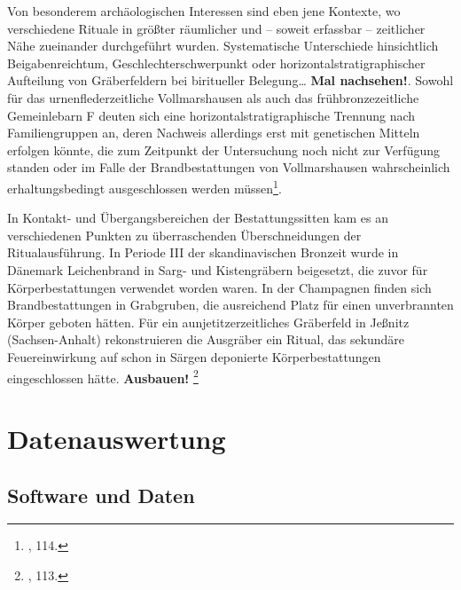 \documentclass[openany,twoside,twocolumn]{book}
\let\rmarkdownfootnote\footnote%
\def\footnote{\protect\rmarkdownfootnote}
\let\pby\printbibliography
\renewcommand{\printbibliography}{}
\begin{document}
Von besonderem archäologischen Interessen sind eben jene Kontexte, wo
verschiedene Rituale in größter räumlicher und -- soweit erfassbar --
zeitlicher Nähe zueinander durchgeführt wurden. Systematische
Unterschiede hinsichtlich Beigabenreichtum, Geschlechterschwerpunkt oder
horizontalstratigraphischer Aufteilung von Gräberfeldern bei biritueller
Belegung\ldots{} \textbf{Mal nachsehen!}. Sowohl für das
urnenflederzeitliche Vollmarshausen als auch das frühbronzezeitliche
Gemeinlebarn F deuten sich eine horizontalstratigraphische Trennung nach
Familiengruppen an, deren Nachweis allerdings erst mit genetischen
Mitteln erfolgen könnte, die zum Zeitpunkt der Untersuchung noch nicht
zur Verfügung standen oder im Falle der Brandbestattungen von
Vollmarshausen wahrscheinlich erhaltungsbedingt ausgeschlossen werden
müssen\footnote{\textcite{harding_european_2000}, 114.}.

In Kontakt- und Übergangsbereichen der Bestattungssitten kam es an
verschiedenen Punkten zu überraschenden Überschneidungen der
Ritualausführung. In Periode III der skandinavischen Bronzeit wurde in
Dänemark Leichenbrand in Sarg- und Kistengräbern beigesetzt, die zuvor
für Körperbestattungen verwendet worden waren. In der Champagnen finden
sich Brandbestattungen in Grabgruben, die ausreichend Platz für einen
unverbrannten Körper geboten hätten. Für ein aunjetitzerzeitliches
Gräberfeld in Jeßnitz (Sachsen-Anhalt) rekonstruieren die Ausgräber ein
Ritual, das sekundäre Feuereinwirkung auf schon in Särgen deponierte
Körperbestattungen eingeschlossen hätte. \textbf{Ausbauen!} \footnote{\textcite{harding_european_2000},
  113.}

\pby[title={Literatur},segment=\therefsegment,heading=subbibintoc]

\hypertarget{data-analysis}{%
\chapter{Datenauswertung}\label{data-analysis}}

\hypertarget{software-und-daten}{%
\section{Software und Daten}\label{software-und-daten}}
\end{document}
